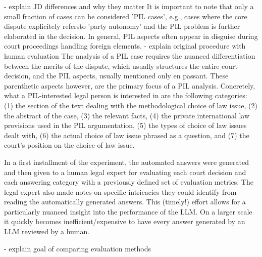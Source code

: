 \documentclass[a4paper,12pt]{article}
\begin{document}
	- explain JD differences and why they matter
It is important to note that only a small fraction of cases can be considered 'PIL cases', e.g., cases where the core dispute explicitely refersto 'party autonomy' and the PIL problem is further elaborated in the decision. In general, PIL aspects often appear in disguise during court proceedings handling foreign elements.
  - explain original procedure with human evaluation
The analysis of a PIL case requires the nuanced differentiation between the merits of the dispute, which usually structures the entire court decision, and the PIL aspects, usually mentioned only en passant. These parenthetic aspects however, are the primary focus of a PIL analysis. Concretely, what a PIL-interested legal person is interested in are the following categories: (1) the section of the text dealing with the methodological choice of law issue, (2) the abstract of the case, (3) the relevant facts, (4) the private international law provisions used in the PIL argumentation, (5) the types of choice of law issues dealt with, (6) the actual choice of law issue phrased as a question, and (7) the court's position on the choice of law issue.

In a first installment of the experiment, the automated answers were generated and then given to a human legal expert for evaluating each court decision and each answering category with a previously defined set of evaluation metrics. The legal expert also made notes on specific intricacies they could identify from reading the automatically generated answers. This (timely!) effort allows for a particularly nuanced insight into the performance of the LLM. On a larger scale it quickly becomes inefficient/expensive to have every answer generated by an LLM reviewed by a human.

- explain goal of comparing evaluation methods
\end{document}
